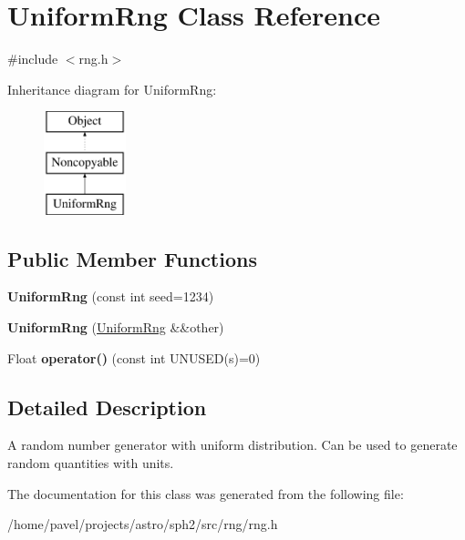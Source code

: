 \hypertarget{classUniformRng}{}\section{Uniform\+Rng Class Reference}
\label{classUniformRng}


{\ttfamily \#include $<$rng.\+h$>$}

Inheritance diagram for Uniform\+Rng\+:\begin{figure}[H]
\begin{center}
\leavevmode
\includegraphics[height=3.000000cm]{classUniformRng}
\end{center}
\end{figure}
\subsection*{Public Member Functions}
\begin{DoxyCompactItemize}
\item 
\hypertarget{classUniformRng_a8decccbf3e4c61a51828c5436e77d1e2}{}\label{classUniformRng_a8decccbf3e4c61a51828c5436e77d1e2} 
{\bfseries Uniform\+Rng} (const int seed=1234)
\item 
\hypertarget{classUniformRng_ad46c5c9c2399b0d53e73f69b3eb08a6b}{}\label{classUniformRng_ad46c5c9c2399b0d53e73f69b3eb08a6b} 
{\bfseries Uniform\+Rng} (\hyperlink{classUniformRng}{Uniform\+Rng} \&\&other)
\item 
\hypertarget{classUniformRng_ae52d956ef9f27c54b249fe8cccc2cd90}{}\label{classUniformRng_ae52d956ef9f27c54b249fe8cccc2cd90} 
Float {\bfseries operator()} (const int U\+N\+U\+S\+ED(s)=0)
\end{DoxyCompactItemize}


\subsection{Detailed Description}
A random number generator with uniform distribution. Can be used to generate random quantities with units. 

The documentation for this class was generated from the following file\+:\begin{DoxyCompactItemize}
\item 
/home/pavel/projects/astro/sph2/src/rng/rng.\+h\end{DoxyCompactItemize}
